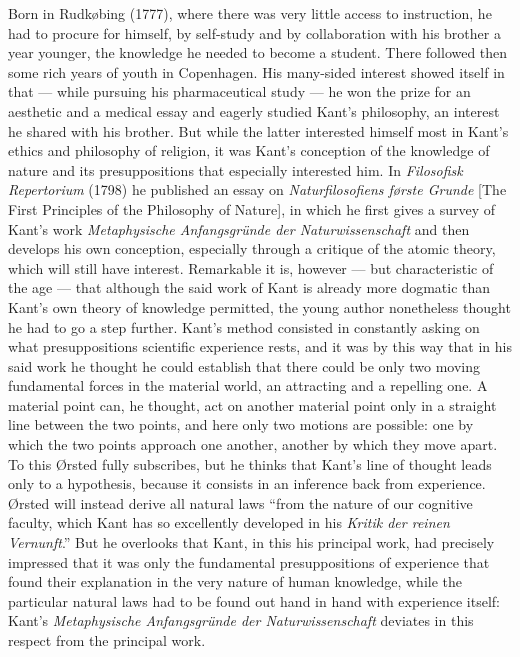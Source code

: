\documentclass[12pt,a4paper]{book}
\newcommand{\opage}[1]{\marginnote{\footnotesize\textit{[#1]}}}
\begin{document}
Born in Rudkøbing (1777), where there was very little access to instruction, he had
to procure for himself, by self-study and by collaboration with his brother a year
younger, the knowledge he needed to become a student. There followed then some rich
years of youth in Copenhagen. His many-sided interest showed itself in that ---
while pursuing his pharmaceutical study --- he won the prize for an aesthetic and a
medical essay and eagerly studied Kant's philosophy, an interest he shared with his
brother. But while the latter interested himself most in Kant's ethics and
philosophy of religion, it was Kant's conception of the knowledge of nature and its
presuppositions that especially interested him. In \emph{Filosofisk Repertorium}
(1798) he published an essay on \emph{Naturfilosofiens første Grunde} [The First
Principles of the Philosophy of Nature], in which he first gives a survey of Kant's
work \emph{Metaphysische Anfangsgründe der Naturwissenschaft} and then develops his
own conception, especially through a critique of the atomic theory, which will still
have interest. Remarkable it is, however --- but characteristic of the age --- that
although the said work of Kant is already more dogmatic than Kant's own theory of
knowledge permitted, the young author nonetheless thought he had to go a step
further. Kant's method consisted in constantly asking on what \opage{50}presuppositions
scientific experience rests, and it was by this way that in his said work he thought
he could establish that there could be only two moving fundamental forces in the
material world, an attracting and a repelling one. A material point can, he thought,
act on another material point only in a straight line between the two points, and
here only two motions are possible: one by which the two points approach one
another, another by which they move apart. To this Ørsted fully subscribes, but he
thinks that Kant's line of thought leads only to a hypothesis, because it consists in
an inference back from experience. Ørsted will instead derive all natural laws
``from the nature of our cognitive faculty, which Kant has so excellently developed
in his \emph{Kritik der reinen Vernunft}.'' But he overlooks that Kant, in this his
principal work, had precisely impressed that it was only the fundamental
presuppositions of experience that found their explanation in the very nature of
human knowledge, while the particular natural laws had to be found out hand in hand
with experience itself: Kant's \emph{Metaphysische Anfangsgründe der
Naturwissenschaft} deviates in this respect from the principal work.
\end{document}

